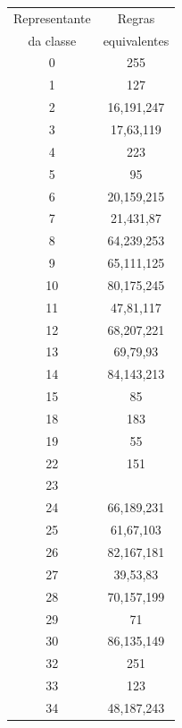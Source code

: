 \documentclass[12pt,a4paper]{article}
\begin{document}
\begin{table}[H]
\begin{minipage}[b]{0.3\linewidth}\centering
\begin{tabular}{|c|c|}
\hline
\footnotesize Representante & \footnotesize Regras \\
{\footnotesize da classe} & \footnotesize equivalentes \\ \hline
0   & 255 \\ \hline
1   & 127 \\ \hline
2   & 16,191,247 \\ \hline
3   & 17,63,119 \\ \hline
4   & 223 \\ \hline
5   & 95 \\ \hline
6   & 20,159,215 \\ \hline
7   & 21,431,87 \\ \hline
8   & 64,239,253 \\ \hline
9   & 65,111,125 \\ \hline
10  & 80,175,245 \\ \hline
11  & 47,81,117 \\ \hline
12  & 68,207,221 \\ \hline
13  & 69,79,93 \\ \hline
14  & 84,143,213 \\ \hline
15  & 85 \\ \hline
18  & 183 \\ \hline
19  & 55 \\ \hline
22  & 151 \\ \hline
23  & \\ \hline
24  & 66,189,231 \\ \hline
25  & 61,67,103 \\ \hline
26  & 82,167,181 \\ \hline
27  & 39,53,83 \\ \hline
28  & 70,157,199 \\ \hline
29  & 71 \\ \hline
30  & 86,135,149 \\ \hline
32  & 251 \\ \hline
33  & 123 \\ \hline
34  & 48,187,243 \\ \hline
\end{tabular}
\end{minipage}
\hspace{0.3cm}
\begin{minipage}[b]{0.3\linewidth}
\centering
\begin{tabular}{|c|c|}

\end{tabular}
\end{minipage}
\end{table}
\end{document}
